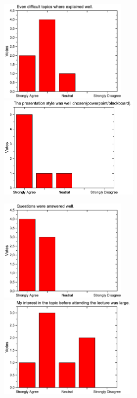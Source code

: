 \begin{figure}[H]
  \begin{minipage}{.48\linewidth}
    \centering
      {\includegraphics[height=50mm]{figures/n/Graph67.pdf}}
      {\includegraphics[height=50mm]{figures/n/Graph68.pdf}}
  \end{minipage}\quad
  \begin{minipage}{.48\linewidth}
    \centering
      {\includegraphics[height=50mm]{figures/n/Graph69.pdf}}
      {\includegraphics[height=50mm]{figures/n/Graph70.pdf}}
  \end{minipage}
\end{figure}

